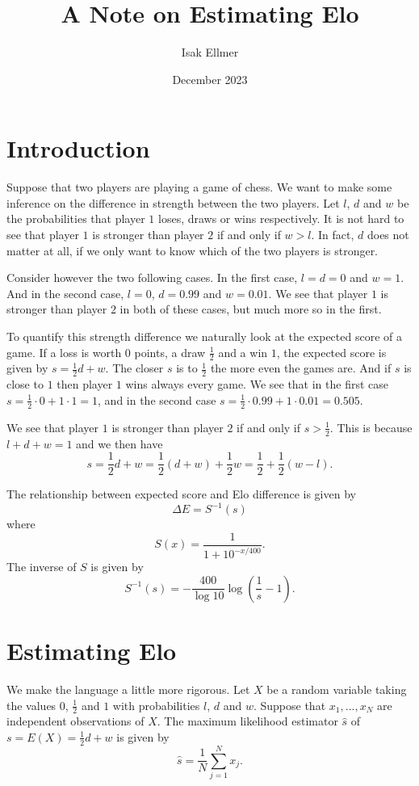 \documentclass{article}
\title{A Note on Estimating Elo}
\author{Isak Ellmer}
\date{December 2023}
\theoremstyle{plain}
\theoremstyle{definition}
\begin{document}
\maketitle

\section{Introduction}
Suppose that two players are playing a game of chess. We want to make some inference
on the difference in strength between the two players. Let $l$, $d$ and $w$ be the
probabilities that player $1$ loses, draws or wins respectively. It is not hard to see
that player $1$ is stronger than player $2$ if and only if $w>l$. In fact, $d$ does not
matter at all, if we only want to know which of the two players is stronger.

Consider however the two following cases. In the first case, $l=d=0$ and $w=1$. And in
the second case, $l=0$, $d=0.99$ and $w=0.01$. We see that player $1$ is stronger than
player $2$ in both of these cases, but much more so in the first.

To quantify this
strength difference we naturally look at the expected score of a game. If a loss is worth
$0$ points, a draw $\frac12$ and a win $1$, the expected score is given by
$s=\frac12d+w$. The closer $s$ is to $\frac12$ the more even the games are. And if $s$
is close to $1$ then player $1$ wins always every game. We see that in the first case
$s=\frac12\cdot0+1\cdot1=1$, and in the second case $s=\frac12\cdot0.99+1\cdot0.01=0.505$.

We see that player $1$ is stronger than player $2$ if and only if $s>\frac12$. This is
because $l+d+w=1$ and we then have
$$s=\frac12d+w=\frac12(d+w)+\frac12w=\frac12+\frac12(w-l).$$

The relationship between expected score and Elo difference \cite{wikipedia_elo} is given
by $$\Delta E=S^{-1}(s)$$ where $$S(x)=\frac1{1+10^{-x/400}}.$$ The inverse of $S$
is given by $$S^{-1}(s)=-\frac{400}{\log10}\log\left(\frac1s-1\right).$$

\section{Estimating Elo}\label{confidence}
We make the language a little more rigorous. Let $X$ be a random variable taking
the values $0$, $\frac12$ and $1$ with probabilities $l$, $d$ and $w$. Suppose that
$x_1,...,x_N$ are independent observations of $X$. The maximum likelihood estimator
$\hat s$ of $s=E(X)=\frac12d+w$ is given by $$\hat s=\frac1N\sum_{j=1}^Nx_j.$$
\end{document}
